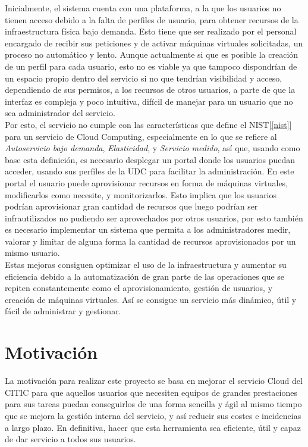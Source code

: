 Inicialmente, el sistema cuenta con una plataforma, a la que los usuarios no tienen acceso debido a la falta de perfiles de usuario, para obtener recursos de la infraestructura física bajo demanda. Esto tiene que ser realizado por el personal encargado de recibir sus peticiones y de activar máquinas virtuales solicitadas, un proceso no automático y lento.
Aunque actualmente si que es posible la creación de un perfil para cada usuario, esto no es viable ya que tampoco dispondrían de un espacio propio dentro del servicio si no que tendrían visibilidad y acceso, dependiendo de sus permisos, a los recursos de otros usuarios, a parte de que la interfaz es compleja y poco intuitiva, difícil de manejar para un usuario que no sea administrador del servicio.\\
Por esto, el servicio no cumple con las características que define el NIST[\ref{nist}] para un servicio de Cloud Computing, especialmente en lo que se refiere al \emph{Autoservicio bajo demanda}, \emph{Elasticidad}, y \emph{Servicio medido}, así que, usando como base esta definición, es necesario desplegar un portal donde los usuarios puedan acceder, usando sus perfiles de la UDC para facilitar la administración. En este portal el usuario puede aprovisionar recursos en forma de máquinas virtuales, modificarlos como necesite, y monitorizarlos. Esto implica que los usuarios podrían aprovisionar gran cantidad de recursos que luego podrían ser infrautilizados no pudiendo ser aprovechados por otros usuarios, por esto también es necesario implementar un sistema que permita a los administradores medir, valorar y limitar de alguna forma la cantidad de recursos aprovisionados por un mismo usuario.\\

Estas mejoras consiguen optimizar el uso de la infraestructura y aumentar su eficiencia debido a la automatización de gran parte de las operaciones que se repiten constantemente como el aprovisionamiento, gestión de usuarios, y creación de máquinas virtuales. Así se consigue un servicio más dinámico, útil y fácil de administrar y gestionar.



\section{Motivación}
La motivación para realizar este proyecto se basa en mejorar el servicio Cloud del CITIC para que aquellos usuarios que necesiten equipos de grandes prestaciones para sus tareas puedan conseguirlos de una forma sencilla y ágil al mismo tiempo que se mejora la gestión interna del servicio, y así reducir sus costes e incidencias a largo plazo. En definitiva, hacer que esta herramienta sea eficiente, útil y capaz de dar servicio a todos sus usuarios.


